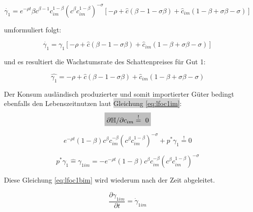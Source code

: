 	\begin{equation}
		\dot{\gamma_1}=e^{-\rho t}\beta c^{\beta-1}c_{im}^{1-\beta}(c^\beta c_{im}^{1-\beta})^{-\sigma}[-\rho+\hat{c}(\beta-1-\sigma\beta)+\hat{c}_{im}(1-\beta+\sigma\beta-\sigma)]\label{eq:lfoc1c}
	\end{equation}


umformuliert folgt:


	\begin{equation*}
		\dot{\gamma_1}=\gamma_1[-\rho+\hat{c}(\beta-1-\sigma\beta)+\hat{c}_{im}(1-\beta+\sigma\beta-\sigma)]\label{eq:foc1c}
	\end{equation*}


und es resultiert die Wachstumsrate des Schattenpreises für Gut 1: 


	\begin{equation}
		\hat{\gamma_1}=-\rho+\hat{c}(\beta-1-\sigma\beta)+\hat{c}_{im}(1-\beta+\sigma\beta-\sigma)\label{eq:foc1dja}
	\end{equation}


Der Konsum ausländisch produzierter und somit importierter Güter bedingt ebenfalls den Lebenszeitnutzen laut \colorbox{lightgray}{Gleichung \eqref{eq:lfoc1im}}: \\


	\begin{equation*}
		\colorbox{lightgray}{$\partial\mathbb{H}/\partial c_{im}\overset{!}{=}~0$}
	\end{equation*}

	
	\begin{equation}
		e^{-\rho t}(1-\beta)c^\beta c_{im}^{-\beta}(c^\beta c_{im}^{1-\beta})^{-\sigma}+p^*\gamma_{1}\overset{!}{=}0\label{eq:lfoc1aim}
	\end{equation}


	\begin{equation}
		p^*\gamma_{1}\hat{=}\gamma_{1im}=-e^{-\rho t}(1-\beta) c^{\beta}c_{im}^{-\beta}(c^\beta c_{im}^{1-\beta})^{-\sigma}\label{eq:lfoc1bim}
	\end{equation}


Diese Gleichung \eqref{eq:lfoc1bim} wird wiederum nach der Zeit abgeleitet.


	\begin{equation}
		\frac{\partial\gamma_{1im}}{\partial t}=\dot{\gamma}_{1im}
	\end{equation}


